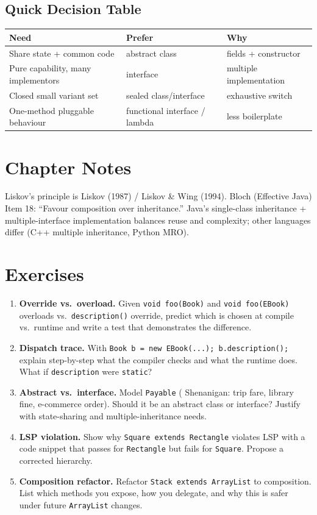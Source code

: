 \subsection{Quick Decision Table}
\begin{center}
\small
\begin{tabular}{lll}
\toprule
Need & Prefer & Why \\
\midrule
Share state + common code & abstract class & fields + constructor \\
Pure capability, many implementors & interface & multiple implementation \\
Closed small variant set & sealed class/interface & exhaustive switch \\
One-method pluggable behaviour & functional interface / lambda & less boilerplate \\
\bottomrule
\end{tabular}
\end{center}

\section{Chapter Notes}
Liskov's principle is Liskov (1987) / Liskov \& Wing (1994). Bloch (Effective Java) Item 18: ``Favour composition over inheritance.'' Java's single-class inheritance + multiple-interface implementation balances reuse and complexity; other languages differ (C++ multiple inheritance, Python MRO).

\section{Exercises}
\label{sec:ch03-exercises}
\begin{enumerate}[label=E3.\arabic*, leftmargin=*, itemsep=0.8em]
    \item \textbf{Override vs.\ overload.} Given \texttt{void foo(Book)} and \texttt{void foo(EBook)} overloads vs.\ \texttt{description()} override, predict which is chosen at compile vs.\ runtime and write a test that demonstrates the difference.
    \item \textbf{Dispatch trace.} With \texttt{Book b = new EBook(...); b.description();} explain step-by-step what the compiler checks and what the runtime does. What if \texttt{description} were \texttt{static}?
    \item \textbf{Abstract vs.\ interface.} Model \texttt{Payable} ( Shenanigan: trip fare, library fine, e-commerce order). Should it be an abstract class or interface? Justify with state-sharing and multiple-inheritance needs.
    \item \textbf{LSP violation.} Show why \texttt{Square extends Rectangle} violates LSP with a code snippet that passes for \texttt{Rectangle} but fails for \texttt{Square}. Propose a corrected hierarchy.
    \item \textbf{Composition refactor.} Refactor \texttt{Stack extends ArrayList} to composition. List which methods you expose, how you delegate, and why this is safer under future \texttt{ArrayList} changes.
\end{enumerate}
